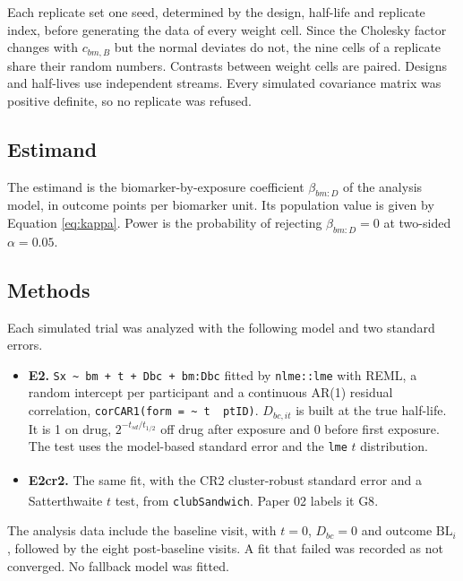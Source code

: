 \documentclass[
  11pt,
]{article}
\providecommand{\tightlist}{%
  \setlength{\itemsep}{0pt}\setlength{\parskip}{0pt}}
\begin{document}
Each replicate set one seed, determined by the design, half-life and
replicate index, before generating the data of every weight cell.
Since the Cholesky factor changes with \(c_{bm,B}\) but the normal
deviates do not, the nine cells of a replicate share their random
numbers. Contrasts between weight cells are paired. Designs and
half-lives use independent streams. Every simulated covariance matrix
was positive definite, so no replicate was refused.

\subsection{Estimand}\label{estimand}

The estimand is the biomarker-by-exposure coefficient
\(\beta_{bm:D}\) of the analysis model, in outcome points per biomarker
unit. Its population value is given by Equation \eqref{eq:kappa}.
Power is the probability of rejecting \(\beta_{bm:D} = 0\) at two-sided
\(\alpha = 0.05\).

\subsection{Methods}\label{sec-methods}

Each simulated trial was analyzed with the following model and two
standard errors.

\begin{itemize}
\tightlist
\item
  \textbf{E2.} \texttt{Sx\ \textasciitilde{}\ bm\ +\ t\ +\ Dbc\ +\ bm:Dbc} fitted by \texttt{nlme::lme} with REML,
  a random intercept per participant and a continuous AR(1) residual
  correlation, \texttt{corCAR1(form\ =\ \textasciitilde{}\ t\ \textbar{}\ ptID)}. \(D_{bc,it}\) is built at
  the true half-life. It is 1 on drug, \(2^{-t_{sd}/t_{1/2}}\) off drug
  after exposure and 0 before first exposure. The test uses the
  model-based standard error and the \texttt{lme} \(t\) distribution.
\item
  \textbf{E2cr2.} The same fit, with the CR2 cluster-robust standard error\textsuperscript{} and a Satterthwaite \(t\) test\textsuperscript{},
  from \texttt{clubSandwich}. Paper 02 labels it G8\textsuperscript{}.
\end{itemize}

The analysis data include the baseline visit, with \(t = 0\),
\(D_{bc} = 0\) and outcome \(\mathrm{BL}_i\), followed by the eight
post-baseline visits. A fit that failed was recorded as not converged.
No fallback model was fitted.
\end{document}
